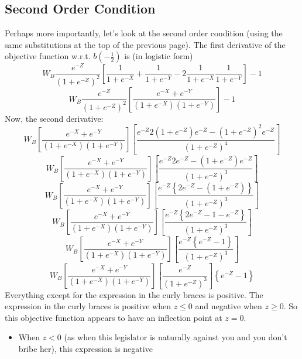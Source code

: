 \documentclass[12pt]{article}
\begin{document}
\begin{itemize}
\subsection{Second Order Condition}
Perhaps more importantly, let's look at the second order condition (using the same substitutions at the top of the previous page). The first derivative of the objective function w.r.t. $b(-\frac{1}{2})$ is (in logistic form)
\begin{equation}
  W_B\frac{e^{-Z}}{\left(1+e^{-Z}\right)^2}\left[\frac{1}{1+e^{-X}} + \frac{1}{1+e^{-Y}} - 2\frac{1}{1+e^{-X}}  \frac{1}{1+e^{-Y}} \right] - 1
\end{equation}
\begin{equation}
  W_B\frac{e^{-Z}}{\left(1+e^{-Z}\right)^2}\left[\frac{e^{-X} + e^{-Y}}{\left(1+e^{-X}\right)\left(1+e^{-Y}\right)} \right] - 1
	\label{eq:firstderiv}
\end{equation}
Now, the second derivative:
\[
  W_B\left[\frac{e^{-X} + e^{-Y}}{\left(1+e^{-X}\right)\left(1+e^{-Y}\right)} \right] \left[ \frac{e^{-Z} 2\left(1+e^{-Z}\right) e^{-Z}-\left(1+e^{-Z}\right)^2 e^{-Z}}{\left(1+e^{-Z}\right)^4} \right]
\]
\[
  W_B\left[\frac{e^{-X} + e^{-Y}}{\left(1+e^{-X}\right)\left(1+e^{-Y}\right)} \right] \left[ \frac{e^{-Z} 2 e^{-Z}-\left(1+e^{-Z}\right) e^{-Z}}{\left(1+e^{-Z}\right)^3} \right]
\]
\[
  W_B\left[\frac{e^{-X} + e^{-Y}}{\left(1+e^{-X}\right)\left(1+e^{-Y}\right)} \right] \left[ \frac{e^{-Z} \left\{2 e^{-Z}-\left(1+e^{-Z}\right) \right\}}{\left(1+e^{-Z}\right)^3} \right]
\]
\[
  W_B\left[\frac{e^{-X} + e^{-Y}}{\left(1+e^{-X}\right)\left(1+e^{-Y}\right)} \right] \left[ \frac{e^{-Z} \left\{2 e^{-Z}-1-e^{-Z} \right\}}{\left(1+e^{-Z}\right)^3} \right]
\]
\[
  W_B\left[\frac{e^{-X} + e^{-Y}}{\left(1+e^{-X}\right)\left(1+e^{-Y}\right)} \right] \left[ \frac{e^{-Z} \left\{e^{-Z}-1 \right\}}{\left(1+e^{-Z}\right)^3} \right]
\]
\[
  W_B\left[\frac{e^{-X} + e^{-Y}}{\left(1+e^{-X}\right)\left(1+e^{-Y}\right)} \right] \left[ \frac{e^{-Z}}{\left(1+e^{-Z}\right)^3} \right] \left\{e^{-Z}-1 \right\}
\]
Everything except for the expression in the curly braces is positive. The expression in the curly braces is positive when $z\leq0$ and negative when $z\geq0$. So this objective function appears to have an inflection point at $z=0$.
\begin{itemize}
	\item When $z < 0$ (as when this legislator is naturally against you and you don't bribe her), this expression is negative
\end{itemize}


\end{itemize}
\end{document}

